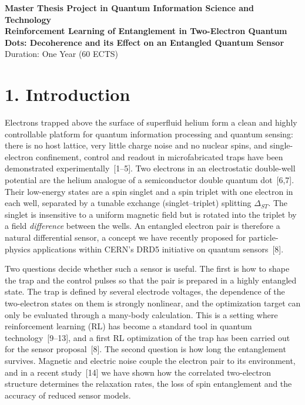 \documentclass[12pt,a4paper]{article}
\begin{document}
\begin{center}
    {\Large \textbf{Master Thesis Project in Quantum Information Science and Technology}}\\[0.3cm]
    {\large \textbf{Reinforcement Learning of Entanglement in Two-Electron Quantum Dots: Decoherence and its Effect on an Entangled Quantum Sensor}}\\[0.2cm]
    \vspace{0.3cm}
    {Duration: One Year (60 ECTS)}
\end{center}

\vspace{1cm}

\section*{1. Introduction}

Electrons trapped above the surface of superfluid helium form a clean
and highly controllable platform for quantum information processing
and quantum sensing: there is no host lattice, very little charge
noise and no nuclear spins, and single-electron confinement, control
and readout in microfabricated traps have been demonstrated
experimentally~[1--5].  Two electrons in an electrostatic double-well
potential are the helium analogue of a semiconductor double quantum
dot~[6,7].  Their low-energy states are a spin singlet and a spin
triplet with one electron in each well, separated by a tunable
exchange (singlet--triplet) splitting $\Delta_{ST}$.  The singlet is
insensitive to a uniform magnetic field but is rotated into the
triplet by a field \emph{difference} between the wells.  An entangled
electron pair is therefore a natural differential sensor, a concept we
have recently proposed for particle-physics applications within
CERN's DRD5 initiative on quantum sensors~[8].

Two questions decide whether such a sensor is useful.  The first is
how to shape the trap and the control pulses so that the pair is
prepared in a highly entangled state.  The trap is defined by several
electrode voltages, the dependence of the two-electron states on them
is strongly nonlinear, and the optimization target can only be
evaluated through a many-body calculation.  This is a setting where
reinforcement learning (RL) has become a standard tool in quantum
technology~[9--13], and a first RL optimization of the trap has been
carried out for the sensor proposal~[8].  The second question is how
long the entanglement survives.  Magnetic and electric noise couple
the electron pair to its environment, and in a recent
study~[14] we have shown how the correlated two-electron structure
determines the relaxation rates, the loss of spin entanglement and the
accuracy of reduced sensor models.
\end{document}

